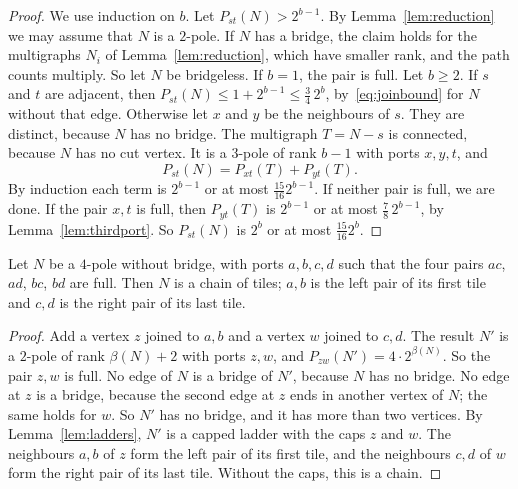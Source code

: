 \begin{proof}
We use induction on $b$. Let $P_{st}(N)>2^{b-1}$. By Lemma~\ref{lem:reduction} we may assume that
$N$ is a $2$-pole. If $N$ has a bridge, the claim holds for the multigraphs $N_i$ of
Lemma~\ref{lem:reduction}, which have smaller rank, and the path counts multiply. So let $N$ be
bridgeless. If $b=1$, the pair is full. Let $b\ge2$. If $s$ and $t$ are adjacent, then
$P_{st}(N)\le1+2^{b-1}\le\frac34\,2^{b}$, by~\eqref{eq:joinbound} for $N$ without that edge.
Otherwise let $x$ and $y$ be the neighbours of $s$. They are distinct, because $N$ has no bridge.
The multigraph $T=N-s$ is connected, because $N$ has no cut vertex. It is a $3$-pole of rank $b-1$
with ports $x,y,t$, and
\[
  P_{st}(N)=P_{xt}(T)+P_{yt}(T).
\]
By induction each term is $2^{b-1}$ or at most $\frac{15}{16}2^{b-1}$. If neither pair is full, we
are done. If the pair $x,t$ is full, then $P_{yt}(T)$ is $2^{b-1}$ or at most $\frac78\,2^{b-1}$,
by Lemma~\ref{lem:thirdport}. So $P_{st}(N)$ is $2^{b}$ or at most $\frac{15}{16}2^{b}$.
\end{proof}

\begin{corollary}\label{cor:fourports}
Let $N$ be a $4$-pole without bridge, with ports $a,b,c,d$ such that the four pairs $ac$, $ad$,
$bc$, $bd$ are full. Then $N$ is a chain of tiles; $a,b$ is the left pair of its first tile and
$c,d$ is the right pair of its last tile.
\end{corollary}

\begin{proof}
Add a vertex $z$ joined to $a,b$ and a vertex $w$ joined to $c,d$. The result $N'$ is a $2$-pole
of rank $\beta(N)+2$ with ports $z,w$, and $P_{zw}(N')=4\cdot2^{\beta(N)}$. So the pair $z,w$ is
full. No edge of $N$ is a bridge of $N'$, because $N$ has no bridge. No edge at $z$ is a bridge,
because the second edge at $z$ ends in another vertex of $N$; the same holds for $w$. So $N'$ has
no bridge, and it has more than two vertices. By Lemma~\ref{lem:ladders}, $N'$ is a capped ladder
with the caps $z$ and $w$. The neighbours $a,b$ of $z$ form the left pair of
its first tile, and the neighbours $c,d$ of $w$ form the right pair of its last tile. Without the
caps, this is a chain.
\end{proof}
